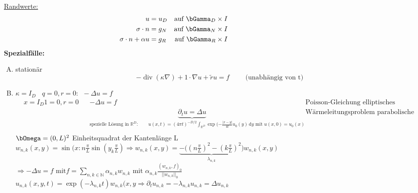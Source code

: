 \documentclass[12pt,twoside,reqno]{article}
\newcommand{\dy}{\,\mathrm{d}y}
\renewcommand\div{\operatorname{div}}
\renewcommand{\Omega}{\bOmega}
\renewcommand{\Gamma}{\bGamma}
\newcommand{\R}{\mathbb{R}}
\newcommand{\N}{\mathbb{N}}
\newcommand{\rs}{\tilde{r}}
\theoremstyle{TheoWieners}
\theoremstyle{break}
\theoremstyle{app}
\newtheorem{Spezielle Lösungen}[app]{Spezielle Lösungen}
\newtheorem{Spezielle Lösungen der Poisson-Gleichung}[app]{Spezielle Lösungen der Poisson-Gleichung}
\newtheorem{Kartesische Gitter in 2-d}[app]{Kartesische Gitter in 2-d}
\newtheorem{Diskretisierungen hoher Ordnung}[app]{Diskretisierungen hoher Ordnung}
\newtheorem{Zyklische Reduktion}[app]{Zyklische Reduktion}
\begin{document}
        
        \underline{Randwerte:}
            \begin{align*}
\qquad\qquad\qquad   \qquad   u &= u_D    &\text{auf } \Gamma_D \times I & \qquad\qquad \qquad\qquad\qquad \qquad  \qquad \qquad\\
        \sigma \cdot n &= g_N    &\text{auf } \Gamma_N \times I \\
        \sigma \cdot n  + \alpha u &= g_R    &\text{auf } \Gamma_R \times I \\
    \end{align*}
    \textbf{Spezialfälle:}
    \begin{enumerate}[A)]
  \item stationär $$-\div ( \kappa \nabla) + 1 \cdot \nabla u + \rs u= f \qquad \text{  (unabhängig von t)}$$
      \item $\kappa = I_D \ \ \ \ q=0, r=0: \ \ -\Delta u =f $          \begin{align*}
        &x = I_D 1=0, r=0    &&-\Delta u =f && \text{Poisson-Gleichung elliptisches Modellproblem} \\
        &    &&\underbrace{\partial_t u =\Delta u}_{\text{spezielle Lösung in } \R^D: \qquad u(x,t)= (4 \pi t)^{-D/2} \int_{\R^D} \exp(- \frac{|x-y|}{4t}u_0(y) \dy \text{ mit } u(x,0)= u_0(x)} &&\text{Wärmeleitungsproblem parabolische Modellproblem}\\
    \end{align*} 
     $\Omega =(0,L)^2$ Einheitsquadrat  der Kantenlänge L \\
     $w_{n,k}(x,y) = \sin(x:n \frac{\pi}{L} \sin(y_k \frac{\pi}{L}) \Rightarrow w_{n,k}(x,y)=\underbrace{- \Big( (n\frac{\pi}{L})^2-(k\frac{\pi}{L})^2 \Big)}_{\lambda_{n,k}} w_{n,k}(x,y)$\\ $ \Rightarrow - \Delta u =f \text{ mit} f= \sum_{n,k \in \N} \alpha_{n,k} w_{n,k} \text{ mit } \alpha_{n,k} \frac{(w_{n,k},f)_0}{||w_{n,k}||_0}$\\
     $u_{n,k}(x,y,t)= \exp(-\lambda_{n,k} t) w_{n,k} (x,y \Rightarrow \partial_t u_{n,k}= - \lambda_{n,k} u_{n,k}= \Delta u_{n,k}$\\
    

\end{enumerate}
\end{document}
